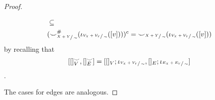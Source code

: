 \begin{proof}
\begin{enumerate}
\begin{align*}
                &\subseteq\\
                &({\smile}_{\sfrac{X+Y}{\sim}}^{{\#}}(\iota_{\sfrac{V_{X} + V_{Y}}{\sim}}([v])))^{c} = {\smile}_{\sfrac{X+Y}{\sim}}(\iota_{\sfrac{V_{X} + V_{Y}}{\sim}}([v]))\\
              \end{align*}
              \fi
              by recalling that 
              \[
              [[]_{V}^{{\smile}}, []_{E}^{{\smile}}] = [[]_{V};\iota_{\sfrac{V_{X} + V_{Y}}{\sim}}, []_{E};\iota_{\sfrac{E_{X} + E_{Y}}{\sim}}]
              \].
    \end{enumerate}

    The cases for edges are analogous.






\end{proof}
